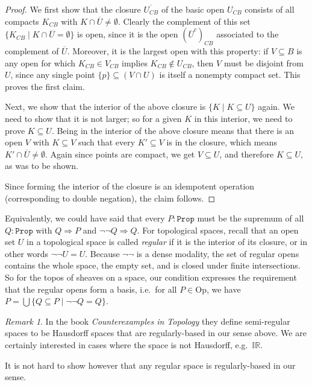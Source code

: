 \documentclass[11pt, oneside, article]{memoir}
\theoremstyle{plain}
\theoremstyle{definition}
\theoremstyle{remark}
\newtheorem{remark}[theorem]{Remark}
\renewcommand{\ss}{\subseteq}
\newcommand{\const}[1]{\mathtt{#1}}
\newcommand{\Set}[1]{\mathrm{#1}}
\newcommand{\ol}[1]{\overline{#1}}
\newcommand{\IR}{\mathbb{IR}} %
\newcommand{\Prop}{\const{Prop}}
\newcommand{\Op}{\Set{Op}}
\newcommand{\BaseSpace}{B}
\newcommand{\imp}{\Rightarrow}
\begin{document}
\begin{proof}
We first show that the closure $\ol{U_{C\BaseSpace}}$ of the basic open $U_{C\BaseSpace}$ consists of all compacts $K_{C\BaseSpace}$ with $K\cap\overline{U} \neq \emptyset$. Clearly the complement of this set $\{K_{C\BaseSpace}\mid K\cap\ol{U}=\emptyset\}$ is open, since it is the open $(\ol{U}^c)_{C\BaseSpace}$ associated to the complement of $\overline{U}$. Moreover, it is the largest open with this property: if $V\subseteq B$ is any open for which $K_{C\BaseSpace}\in V_{C\BaseSpace}$ implies $K_{C\BaseSpace} \not\in U_{C\BaseSpace}$, then $V$ must be disjoint from $U$, since any single point $\{p\}\ss(V\cap U)$ is itself a nonempty compact set. This proves the first claim.

Next, we show that the interior of the above closure is $\{ K \mid K\subseteq U\}$ again. We need to show that it is not larger; so for a given $K$ in this interior, we need to prove $K\subseteq U$. Being in the interior of the above closure means that there is an open $V$ with $K\subseteq V$ such that every $K' \subseteq V$ is in the closure, which means $K' \cap \overline{U} \neq \emptyset$. Again since points are compact, we get $V \subseteq U$, and therefore $K \subseteq U$, as was to be shown.

Since forming the interior of the closure is an idempotent operation (corresponding to double negation), the claim follows.
\end{proof}
Equivalently, we could have said that every $P:\Prop$ must be the supremum of all $Q:\Prop$ with $Q\imp P$ and $\neg\neg Q\imp Q$. For topological spaces, recall that an open set $U$ in a topological space is called \emph{regular} if it is the interior of its closure, or in other words $\neg\neg U=U$. Because $\neg\neg$ is a dense modality, the set of regular opens contains the whole space, the empty set, and is closed under finite intersections. So for the topos of sheaves on a space, our condition expresses the requirement that the regular opens form a basis, i.e.\ for all $P\in\Op$, we have $P=\bigcup {\{Q\ss P\mid \neg\neg Q=Q\}}$.

\begin{remark}
In the book \emph{Counterexamples in Topology} they define semi-regular spaces to be Hausdorff spaces that are regularly-based in our sense above. We are certainly interested in cases where the space is not Hausdorff, e.g.\ $\IR$.

It is not hard to show however that any regular space is regularly-based in our sense. 
\end{remark}
\end{document}
